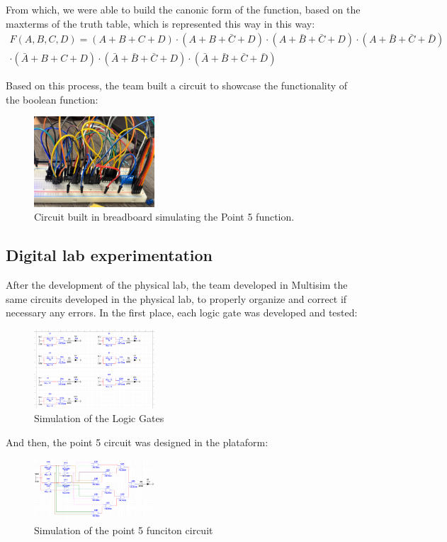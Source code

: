 \documentclass[12pt]{article}  %
\begin{document}
From which, we were able to build the canonic form of the function, based on the maxterms of the truth table, which is represented this way in this way: 
\begin{multline*}
F(A,B,C,D) = (A+B+C+D) \cdot (A+B+\bar{C}+D) \cdot (A+\bar{B}+\bar{C}+D) \cdot (A+\bar{B}+\bar{C}+\bar{D}) \\
\cdot (\bar{A}+B+C+D) \cdot (\bar{A}+\bar{B}+\bar{C}+D) \cdot (\bar{A}+\bar{B}+\bar{C}+\bar{D})
\end{multline*}

Based on this process, the team built a circuit to showcase the functionality of the boolean function:
\begin{figure}[H]
  \centering
  \includegraphics[width=0.4\textwidth]{Point5.jpg}
  \caption{Circuit built in breadboard simulating the Point 5 function.}
  \label{fig:circuit_point_5}
\end{figure}
\subsection{Digital lab experimentation}
After the development of the physical lab, the team developed in Multisim the same circuits developed in the physical lab, to properly organize and correct if necessary any errors.
In the first place, each logic gate was developed and tested:
\begin{figure}[H]
  \centering
  \includegraphics[width=0.4\textwidth]{LogiGates.png}
  \caption{Simulation of the Logic Gates}
  \label{fig:sim_logic_gates}
\end{figure}
And then, the point 5 circuit was designed in the plataform:
\begin{figure}[H]
  \centering
  \includegraphics[width=0.4\textwidth]{Point5Multisim.png}
  \caption{Simulation of the point 5 funciton circuit}
  \label{fig:sim_point_5}
\end{figure}
\end{document}
